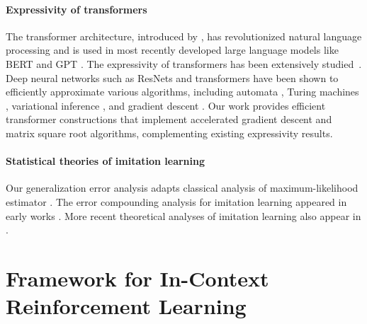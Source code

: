 \documentclass[10pt]{article}
\newcommand{\<}{\left\langle}
\renewcommand{\>}{\right\rangle}
\begin{document}
\paragraph{Expressivity of transformers} The transformer architecture, introduced by \cite{vaswani2017attention}, has revolutionized natural language processing and is used in most recently developed large language models like BERT and GPT \citep{devlin2018bert, brown2020language}. The expressivity of transformers has been extensively studied~\citep{yun2019transformers, perez2019turing, hron2020infinite,yao2021self, bhattamishra2020computational, zhang2022unveiling, liu2022transformers, wei2022statistically, fu2023can, bai2023transformers, akyurek2022learning, von2023transformers}. Deep neural networks such as ResNets and transformers have been shown to efficiently approximate various algorithms, including automata \citep{liu2022transformers}, Turing machines \citep{wei2022statistically}, variational inference \citep{mei2023deep}, and gradient descent \citep{bai2023transformers, akyurek2022learning, von2023transformers}. Our work provides efficient transformer constructions that implement accelerated gradient descent and matrix square root algorithms, complementing existing expressivity results. 





\paragraph{Statistical theories of imitation learning} Our generalization error analysis adapts classical analysis of maximum-likelihood estimator \citep{geer2000empirical}. The error compounding analysis for imitation learning appeared in early works \citep{ross2011reduction, ross2010efficient}. More recent theoretical analyses of imitation learning also appear in \cite{rajaraman2020toward, rajaraman2021provably, rashidinejad2021bridging}. 

















\section{Framework for In-Context Reinforcement Learning}\label{sec:framework}
\end{document}
